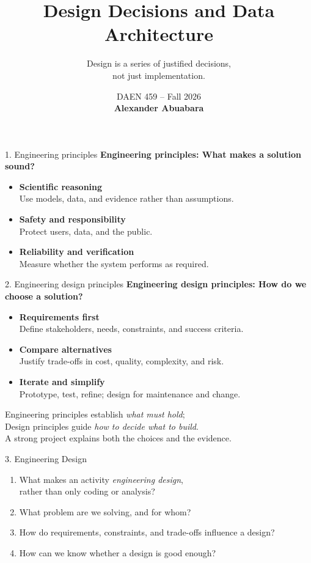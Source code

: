 \documentclass[11pt,aspectratio=43]{beamer}
\title{Design Decisions and Data Architecture}
\subtitle{Design is a series of justified decisions,\\
          not just implementation.}
\author{}
\date{\textcolor{aggiemaroon}{DAEN 459 -- Fall 2026\\
      \textbf{Alexander Abuabara}}}
\begin{document}
\begin{frame}
  \titlepage
  \vspace{-0.6cm}
  \begin{center}
    
  \end{center}
\end{frame}

\begin{frame}{1. Engineering principles}
\textbf{Engineering principles: What makes a solution sound?}
\begin{itemize}
  \item \textbf{Scientific reasoning}\\Use models, data, and evidence rather than assumptions.
  \item \textbf{Safety and responsibility}\\Protect users, data, and the public.
  \item \textbf{Reliability and verification}\\Measure whether the system performs as required.
\end{itemize}
\end{frame}

\begin{frame}{2. Engineering design principles}
\textbf{Engineering design principles: How do we choose a solution?}
\begin{itemize}
  \item \textbf{Requirements first}\\Define stakeholders, needs, constraints, and success criteria.
  \item \textbf{Compare alternatives}\\Justify trade-offs in cost, quality, complexity, and risk.
  \item \textbf{Iterate and simplify}\\Prototype, test, refine; design for maintenance and change.
\end{itemize}
\begin{block}{}
Engineering principles establish \emph{what must hold};\\
Design principles guide \emph{how to decide what to build}.\\
A strong project explains both the choices and the evidence.
\end{block}
\end{frame}

\begin{frame}{3. Engineering Design}
\begin{enumerate}
  \item What makes an activity \emph{engineering design},\\rather than only coding or analysis?
  \item What problem are we solving, and for whom?
  \item How do requirements, constraints, and trade-offs influence a design?
  \item How can we know whether a design is good enough?
\end{enumerate}
\end{frame}
\end{document}
